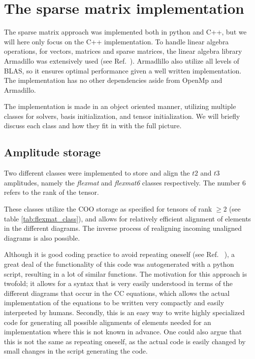 \FloatBarrier

\section{The sparse matrix implementation}

The sparse matrix approach was implemented both in python and C++, but we will here only focus on the C++ implementation. To handle linear algebra operations, for vectors, matrices and sparse matrices, the linear algebra library Armadillo was extensively used (see Ref.~\cite{Armadillo}). Armadlillo also utilize all levels of BLAS, so it ensures optimal performance given a well written implementation. The implementation has no other dependencies aside from OpenMp and Armadillo. 

The implementation is made in an object oriented manner, utilizing multiple classes for solvers, basis initialization, and tensor initialization. We will briefly discuss each class and how they fit in with the full picture.

\subsection{Amplitude storage}

Two different classes were implemented to store and align the $t2$ and $t3$ amplitudes, namely the \emph{flexmat} and \emph{flexmat6} classes respectively. The number 6 refers to the rank of the tensor. 

These classes utilize the COO storage as specified for tensors of rank $\geq 2$ (see table \ref{tab:flexmat_class}), and allows for relatively efficient alignment of elements in the different diagrams. The inverse process of realigning incoming unaligned diagrams is also possible. 

Although it is good coding practice to avoid repeating oneself (see Ref.~ \cite{DRY}), a great deal of the functionality of this code was autogenerated with a python script, resulting in a lot of similar functions. The motivation for this approach is twofold; it allows for a syntax that is very easily understood in terms of the different diagrams that occur in the CC equations, which allows the actual implementation of the equations to be written very compactly and easily interpreted by humans. Secondly, this is an easy way to write highly specialized code for generating all possible alignments of elements needed for an implementation where this is not known in advance. One could also argue that this is not the same as repeating oneself, as the actual code is easily changed by small changes in the script generating the code. 

